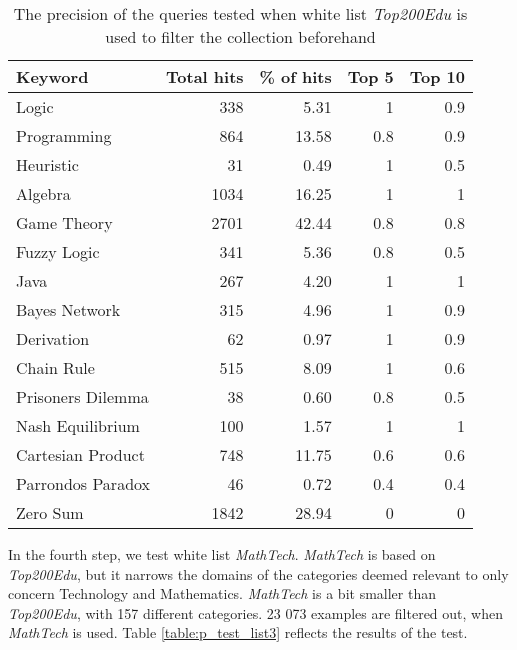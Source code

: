 \begin{table}[H]
\centering
\begin{tabular} {|| p{10em} | r | r | r | r ||} 
 \hline
 Keyword & Total hits & \% of hits & Top 5 & Top 10 \\ [0.5ex] 
 \hline

Logic & 338 & 5.31 & 1 & 0.9 \\
Programming & 864 & 13.58 & 0.8 & 0.9 \\
Heuristic & 31 & 0.49 & 1 & 0.5 \\
Algebra & 1034 & 16.25 & 1 & 1 \\
Game Theory & 2701 & 42.44 & 0.8 & 0.8 \\
\hline
Fuzzy Logic & 341 & 5.36 & 0.8 & 0.5 \\
Java & 267 & 4.20 & 1 & 1 \\
Bayes Network & 315 & 4.96 & 1 & 0.9 \\
Derivation & 62 & 0.97 & 1 & 0.9 \\
\hline
Chain Rule & 515 & 8.09 & 1 & 0.6 \\
Prisoners Dilemma & 38 & 0.60 & 0.8 & 0.5 \\
Nash Equilibrium & 100 & 1.57 & 1 & 1 \\
Cartesian Product & 748 & 11.75 & 0.6 & 0.6 \\
Parrondos Paradox & 46 & 0.72 & 0.4 & 0.4 \\
Zero Sum & 1842 & 28.94 & 0 & 0 \\

 \hline
\end{tabular}
\caption{The precision of the queries tested when white list \textit{Top200Edu} is used to filter the collection beforehand}
\label{table:p_test_list2}
\end{table}

In the fourth step, we test white list \textit{MathTech}. \textit{MathTech} is based on \textit{Top200Edu}, but it narrows the domains of the categories deemed relevant to only concern Technology and Mathematics. \textit{MathTech} is a bit smaller than \textit{Top200Edu}, with 157 different categories. 23 073 examples are filtered out, when \textit{MathTech} is used. Table \ref{table:p_test_list3} reflects the results of the test.

